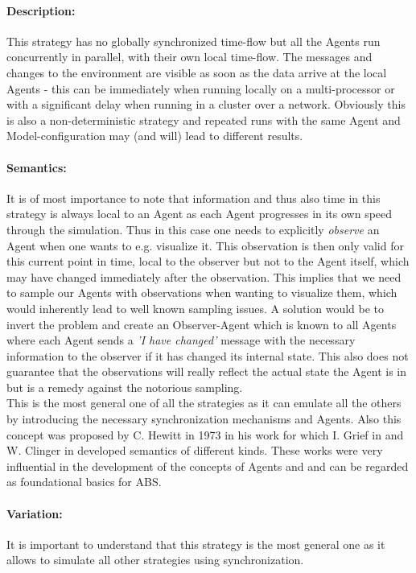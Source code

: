 \paragraph{Description:} This strategy has no globally synchronized time-flow but all the Agents run concurrently in parallel, with their own local time-flow. The messages and changes to the environment are visible as soon as the data arrive at the local Agents - this can be immediately when running locally on a multi-processor or with a significant delay when running in a cluster over a network. Obviously this is also a non-deterministic strategy and repeated runs with the same Agent and Model-configuration may (and will) lead to different results.

\paragraph{Semantics:} It is of most importance to note that information and thus also time in this strategy is always local to an Agent as each Agent progresses in its own speed through the simulation. Thus in this case one needs to explicitly \textit{observe} an Agent when one wants to e.g. visualize it. This observation is then only valid for this current point in time, local to the observer but not to the Agent itself, which may have changed immediately after the observation. This implies that we need to sample our Agents with observations when wanting to visualize them, which would inherently lead to well known sampling issues. A solution would be to invert the problem and create an Observer-Agent which is known to all Agents where each Agent sends a \textit{'I have changed'} message with the necessary information to the observer if it has changed its internal state. This also does not guarantee that the observations will really reflect the actual state the Agent is in but is a remedy against the notorious sampling. \\
This is the most general one of all the strategies as it can emulate all the others by introducing the necessary synchronization mechanisms and Agents. Also this concept was proposed by C. Hewitt in 1973 in his work \cite{hewitt_universal_1973} for which I. Grief in \cite{grief_semantics_1975} and W. Clinger in \cite{clinger_foundations_1981} developed semantics of different kinds. These works were very influential in the development of the concepts of Agents and and can be regarded as foundational basics for ABS.

\paragraph{Variation:} It is important to understand that this strategy is the most general one as it allows to simulate all other strategies using synchronization.